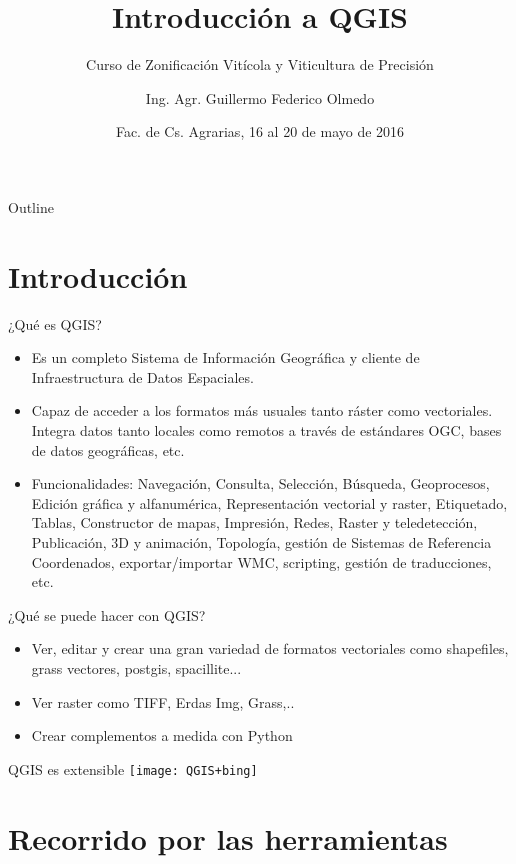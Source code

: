 \documentclass{beamer}
\title[QGIS]{Introducción a QGIS}
\subtitle[]{Curso de Zonificación Vitícola y Viticultura de Precisión}
\author[G.F. Olmedo]{Ing. Agr. Guillermo Federico Olmedo}
\institute[INTA] %
{ Laboratorio de Geomática\\
  Recursos Naturales\\
  INTA EEA Mendoza\\
  \vskip10pt
\begin{columns}
	\column{.5\textwidth}
	\begin{flushright}
		\texttt{[image: logoINTA]}
	\end{flushright}
	\column{.5\textwidth}
	\begin{flushleft}
		\texttt{[image: yo]}
	\end{flushleft}
\end{columns}  
}
\date[FCA, 16-20/05/2016]{Fac. de Cs. Agrarias, 16 al 20 de mayo de 2016}
\begin{document}
\begin{frame}[plain]
  \titlepage
\end{frame}

\begin{frame}{Outline}
	\tableofcontents[pausesections]
\end{frame}

\section{Introducción}

\begin{frame}{¿Qué es QGIS?}
	\begin{itemize}[<+->]
		\item Es un completo Sistema de Información Geográfica y cliente de Infraestructura de Datos Espaciales.
		\item Capaz de acceder a los formatos más usuales tanto ráster como vectoriales. Integra datos tanto locales como remotos a través de estándares OGC, bases de datos geográficas, etc.
		\item Funcionalidades: Navegación, Consulta, Selección, Búsqueda, Geoprocesos, Edición gráfica y alfanumérica, Representación vectorial y raster, Etiquetado, Tablas, Constructor de mapas, Impresión, Redes, Raster y teledetección, Publicación, 3D y animación, Topología, gestión de Sistemas de Referencia Coordenados, exportar/importar WMC, scripting, gestión de traducciones, etc.
	\end{itemize}
\end{frame}

\begin{frame}{¿Qué se puede hacer con QGIS?}
	\begin{itemize}[<+->]
		\item Ver, editar y crear una gran variedad de formatos vectoriales como shapefiles, grass vectores, postgis, spacillite...
		\item Ver raster como TIFF, Erdas Img, Grass,..
		\item Crear complementos a medida con Python
	\end{itemize}
\end{frame}

\begin{frame}{QGIS es extensible}
	\centering
	\texttt{[image: QGIS+bing]}
\end{frame}

\section{Recorrido por las herramientas}
\end{document}

